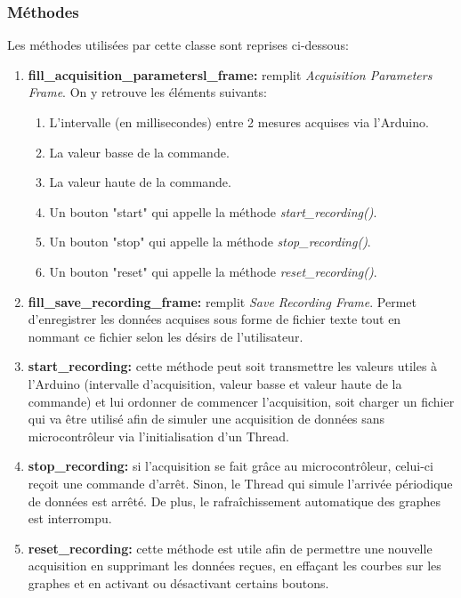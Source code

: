 \subsubsection{Méthodes}

Les méthodes utilisées par cette classe sont reprises ci-dessous:

\begin{enumerate}
    \item \textbf{fill\_acquisition\_parametersl\_frame:} remplit \textit{Acquisition Parameters Frame}. On y retrouve les éléments suivants:
    \begin{enumerate}
        \item L'intervalle (en millisecondes) entre 2 mesures acquises via l'Arduino.
        \item La valeur basse de la commande.
        \item La valeur haute de la commande.
        \item Un bouton "start" qui appelle la méthode \textit{start\_recording()}.
        \item Un bouton "stop" qui appelle la méthode \textit{stop\_recording()}.
        \item Un bouton "reset" qui appelle la méthode \textit{reset\_recording()}.
    \end{enumerate}
    
    \item \textbf{fill\_save\_recording\_frame:} remplit \textit{Save Recording Frame}. Permet d'enregistrer les données acquises sous forme de fichier texte tout en nommant ce fichier selon les désirs de l'utilisateur.
    
    \item \textbf{start\_recording:} cette méthode peut soit transmettre les valeurs utiles à l'Arduino (intervalle d'acquisition, valeur basse et valeur haute de la commande) et lui ordonner de commencer l'acquisition, soit charger un fichier qui va être utilisé afin de simuler une acquisition de données sans microcontrôleur via l'initialisation d'un Thread.
    
    \item \textbf{stop\_recording:} si l'acquisition se fait grâce au microcontrôleur, celui-ci reçoit une commande d'arrêt. Sinon, le Thread qui simule l'arrivée périodique de données est arrêté. De plus, le rafraîchissement automatique des graphes est interrompu.
    
    \item \textbf{reset\_recording:} cette méthode est utile afin de permettre une nouvelle acquisition en supprimant les données reçues, en effaçant les courbes sur les graphes et en activant ou désactivant certains boutons.
    

\end{enumerate}
